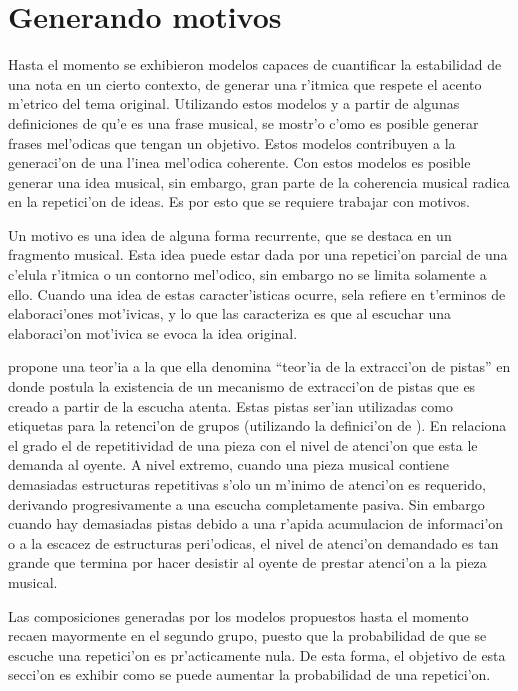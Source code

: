 \section{Generando motivos}
Hasta el momento se exhibieron modelos capaces de cuantificar la estabilidad de una nota en un cierto contexto, de generar una r'itmica que
respete el acento m'etrico del tema original. Utilizando estos modelos y a partir de algunas definiciones de qu'e es una frase musical, se mostr'o c'omo es posible
generar frases mel'odicas que tengan un objetivo. Estos modelos contribuyen a la generaci'on de una l'inea mel'odica coherente. Con estos modelos es posible
generar una idea musical, sin embargo, gran parte de la coherencia musical radica en la repetici'on de ideas. Es por esto que se requiere trabajar con motivos. 

Un motivo es una idea de alguna forma recurrente, que se destaca en un fragmento musical. Esta idea puede estar dada por una repetici'on parcial de una c'elula 
r'itmica o un contorno mel'odico, sin embargo no se limita solamente a ello. Cuando una idea de estas caracter'isticas ocurre, sela refiere en t'erminos
de elaboraci'ones mot'ivicas, y lo que las caracteriza es que al escuchar una elaboraci'on mot'ivica se evoca la idea original.

\cite{Deliege87} propone una teor'ia a la que ella denomina ``teor'ia de la extracci'on de pistas'' en donde postula la existencia de un mecanismo de 
extracci'on de pistas 
que es creado a partir de la escucha atenta. Estas pistas ser'ian utilizadas como etiquetas para la retenci'on de grupos (utilizando la definici'on de 
\cite{LerdahlJackendoff83}). En \cite{Deliege90} relaciona el grado el
de repetitividad de una pieza con el nivel de atenci'on que esta le demanda al oyente. A nivel extremo, cuando una pieza musical contiene demasiadas estructuras 
repetitivas s'olo un m'inimo de atenci'on es requerido, derivando progresivamente a una escucha completamente pasiva. Sin embargo cuando hay demasiadas 
pistas debido a una r'apida acumulacion de informaci'on o a la escacez de estructuras peri'odicas, el nivel de atenci'on demandado es tan grande que 
termina por hacer desistir al oyente de prestar atenci'on a la pieza musical.

Las composiciones generadas por los modelos propuestos hasta el momento recaen mayormente en el segundo grupo, puesto que la probabilidad de que se escuche
una repetici'on es pr'acticamente nula. De esta forma, el objetivo de esta secci'on es exhibir como se puede aumentar la probabilidad de una repetici'on.



